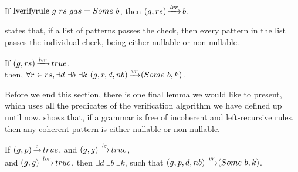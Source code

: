 \begin{lemma}
    If $\text{lverifyrule}{}\ g\ rs\ gas = Some\ b$,
    then $(g,rs) \operatorname{\xrightarrow{\mathit{lvr}}} b$.
    \label{lemma:lverifyrule-follows}
\end{lemma}

 states that,
if a list of patterns passes the check,
then every pattern in the list
passes the individual check,
being either nullable or non-nullable.

\begin{lemma}%
    If $(g,rs) \operatorname{\xrightarrow{\mathit{lvr}}} true$, \\
    then, $\forall r \in rs, \exists d\ \exists b\ \exists k\ \VerifyRule{g}{r}{d}{nb}{\Some b}{k}$.
    \label{lemma:lverifyrule-safety}
\end{lemma}

Before we end this section,
there is one final lemma we would like to present,
which uses all the predicates of the verification algorithm
we have defined up until now.
 shows that,
if a grammar is free of incoherent and left-recursive rules,
then any coherent pattern is either nullable or non-nullable.

\begin{lemma}%
    If $(g,p) \operatorname{\xrightarrow{\mathit{c}}} true$,
    and $(g,g) \operatorname{\xrightarrow{\mathit{lc}}} true$, \\
    and $(g,g) \operatorname{\xrightarrow{\mathit{lvr}}} true$,
    then $\exists d\ \exists b\ \exists k$,
    such that $(g,p,d,nb) \operatorname{\xrightarrow{\mathit{vr}}} (Some\ b,k)$.
    \label{lemma:no-lr-rule-in-grammar}
\end{lemma}
